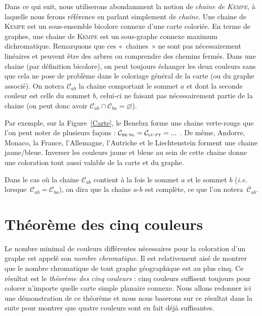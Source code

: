 \documentclass[french]{report}
\begin{document}
Dans ce qui suit, nous utiliserons abondamment la notion de \textit{chaine de \textsc{Kempe}}, à laquelle nous ferons référence en parlant simplement de \textit{chaine}. Une chaine de \textsc{Kempe} est un sous-ensemble bicolore connexe d'une carte coloriée. En terme de graphes, une chaine de \textsc{Kempe} est un sous-graphe connexe maximum dichromatique. Remarquons que ces «~chaines~» ne sont pas nécessairement linéaires et peuvent être des arbres ou comprendre des chemins fermés. Dans une chaine (par définition bicolore), on peut toujours échanger les deux couleurs sans que cela ne pose de problème dans le coloriage général de la carte (ou du graphe associé). On notera $\mathcal{C}_{ab}$ la chaine comportant le sommet $a$ et dont la seconde couleur est celle du sommet $b$, celui-ci ne faisant pas nécessairement partie de la chaine (on peut donc avoir $\mathcal{C}_{ab}\cap\mathcal{C}_{ba}=\varnothing$).

Par exemple, sur la Figure~\ref{Carte}, le Benelux forme une chaine verte-rouge que l'on peut noter de plusieurs façons : $\mathcal{C}_{\textsc{be}\cdot\textsc{nl}}=\mathcal{C}_{\textsc{lu}\cdot\textsc{pt}}=...$ . De même, Andorre, Monaco, la France, l'Allemagne, l'Autriche et le Liechtenstein forment une chaine jaune/bleue. Inverser les couleurs jaune et bleue au sein de cette chaine donne une coloration tout aussi valable de la carte et du graphe.

Dans le cas où la chaine $\mathcal{C}_{ab}$ contient à la fois le sommet $a$ et le sommet $b$ (\textit{i.e.} lorsque~$\mathcal{C}_{ab}=\mathcal{C}_{ba}$), on dira que la chaine $a$-$b$ est complète, ce que l'on notera~$\overline{\mathcal{C}}_{ab}$.


\chapter{Théorème des cinq couleurs}

Le nombre minimal de couleurs différentes nécessaires pour la coloration d'un graphe est appelé son \textit{nombre chromatique}. Il est relativement aisé de montrer que le nombre chromatique de tout graphe géographique est au plus cinq. Ce résultat est le \textit{théorème des cinq couleurs} : cinq couleurs suffisent toujours pour colorer n'importe quelle carte simple planaire connexe. Nous allons redonner ici une démonstration de ce théorème et nous nous baserons sur ce résultat dans la suite pour montrer que quatre couleurs sont en fait déjà suffisantes.
\end{document}
